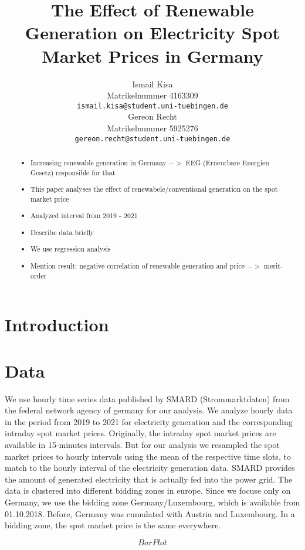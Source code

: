 \documentclass{article}
\title{The Effect of Renewable Generation on Electricity Spot Market Prices in Germany}
\author{%
Ismail Kisa\\
Matrikelnummer 4163309\\
\texttt{ismail.kisa@student.uni-tuebingen.de}\\
\And Gereon Recht\\
Matrikelnummer 5925276\\
\texttt{gereon.recht@student.uni-tuebingen.de} \\
}
\begin{document}
\maketitle

\begin{abstract}
\begin{itemize}
    \item Increasing renewable generation in Germany $->$ EEG (Erneurbare Energien Gesetz) responsible for that
    \item This paper analyses the effect of renewabele/conventional generation on the spot market price
    \item Analyzed interval from 2019 - 2021
    \item Describe data briefly
    \item We use regression analysis
    \item Mention result: negative correlation of renewable generation and price $->$ merit-order
\end{itemize}


\end{abstract}

\section{Introduction}

\section{Data}
We use hourly time series data published by SMARD (Strommarktdaten) from the federal network agency of germany for our analysis. We analyze hourly data in the period from 2019 to 2021 for electricity generation and the corresponding intraday spot market prices. Originally, the intraday spot market prices are available in 15-minutes intervals. But for our analysis we resampled the spot market prices to hourly intervals using the mean of the respective time slots, to match to the hourly interval of the electricity generation data. SMARD provides the amount of generated electricity that is actually fed into the power grid. The data is clustered into different bidding zones in europe. Since we focuse only on Germany, we use the bidding zone Germany/Luxembourg, which is available from 01.10.2018. Before, Germany was cumulated with Austria and Luxembourg. In a bidding zone, the spot market price is the same everywhere.

\[Bar Plot\]
\end{document}

